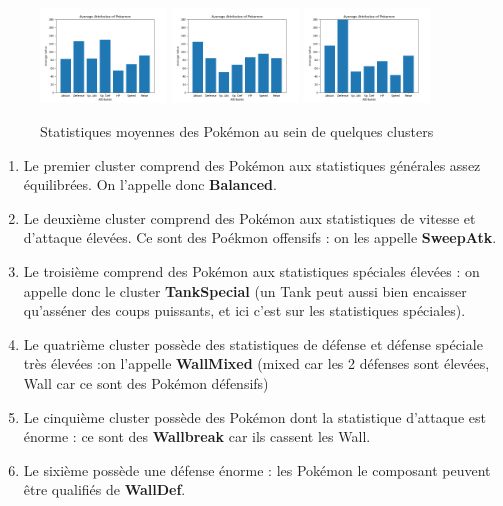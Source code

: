 \documentclass[a4paper,12pt]{article}
\begin{document}
\begin{figure}[!h]
    \includegraphics[width=0.3\textwidth]{Clustering/stats_cluster/9_WallMixed.png}
    \includegraphics[width=0.3\textwidth]{Clustering/stats_cluster/14_WallbreakAtk.png}
    \includegraphics[width=0.3\textwidth]{Clustering/stats_cluster/16_UltraWallDef.png}

    \caption{Statistiques moyennes des Pokémon au sein de quelques clusters}
\end{figure}


\begin{enumerate}
    \item Le premier cluster comprend des Pokémon aux statistiques générales
    assez équilibrées. On l'appelle donc \textbf{Balanced}.
    \item Le deuxième cluster comprend des Pokémon aux statistiques de vitesse
    et d'attaque élevées. Ce sont des Poékmon offensifs : on les appelle
    \textbf{SweepAtk}.
    \item Le troisième comprend des Pokémon aux statistiques spéciales élevées :
    on appelle donc le cluster \textbf{TankSpecial} (un Tank peut aussi bien
    encaisser qu'asséner des coups puissants, et ici c'est sur les statistiques
    spéciales).
    \item Le quatrième cluster possède des statistiques de défense et défense
    spéciale très élevées :on l'appelle \textbf{WallMixed} (mixed car les 2
    défenses sont élevées, Wall car ce sont des Pokémon défensifs)
    \item Le cinquième cluster possède des Pokémon dont la statistique d'attaque
    est énorme : ce sont des \textbf{Wallbreak} car ils cassent les Wall.
    \item Le sixième possède une défense énorme : les Pokémon le composant
    peuvent être qualifiés de \textbf{WallDef}.
\end{enumerate}
\end{document}
